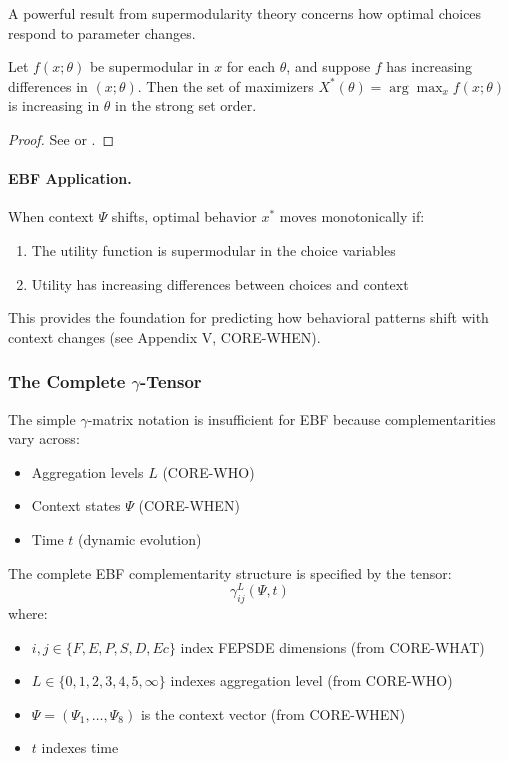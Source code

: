A powerful result from supermodularity theory concerns how optimal choices 
respond to parameter changes.

\begin{theorem}
\label{thm:monotone-statics}
Let $f(x; \theta)$ be supermodular in $x$ for each $\theta$, and suppose 
$f$ has increasing differences in $(x; \theta)$. Then the set of maximizers 
$X^*(\theta) = \arg\max_x f(x; \theta)$ is increasing in $\theta$ in the 
strong set order.
\end{theorem}

\begin{proof}
See \citet{milgromshannon1994} or \citet{topkis1998}.
\end{proof}

\paragraph{EBF Application.}
When context $\Psi$ shifts, optimal behavior $x^*$ moves monotonically if:
\begin{enumerate}
    \item The utility function is supermodular in the choice variables
    \item Utility has increasing differences between choices and context
\end{enumerate}

This provides the foundation for predicting how behavioral patterns shift 
with context changes (see Appendix V, CORE-WHEN).

\subsubsection{The Complete $\gamma$-Tensor}

The simple $\gamma$-matrix notation is insufficient for EBF because 
complementarities vary across:
\begin{itemize}
    \item Aggregation levels $L$ (CORE-WHO)
    \item Context states $\Psi$ (CORE-WHEN)
    \item Time $t$ (dynamic evolution)
\end{itemize}

\begin{definition}
\label{def:gamma-tensor}
The complete EBF complementarity structure is specified by the tensor:
\begin{equation}
    \gamma^L_{ij}(\Psi, t)
    \label{eq:gamma-tensor}
\end{equation}
where:
\begin{itemize}
    \item $i, j \in \{F, E, P, S, D, Ec\}$ index FEPSDE dimensions (from CORE-WHAT)
    \item $L \in \{0, 1, 2, 3, 4, 5, \infty\}$ indexes aggregation level (from CORE-WHO)
    \item $\Psi = (\Psi_1, \ldots, \Psi_8)$ is the context vector (from CORE-WHEN)
    \item $t$ indexes time
\end{itemize}
\end{definition}

